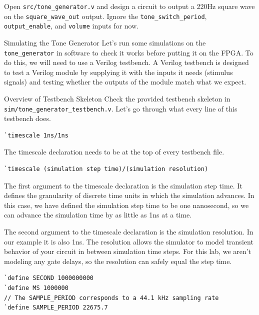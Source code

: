 \documentclass[11pt]{article}
\makeatletter
\renewcommand{\section}
{\@startsection {section}{1}{0pt}
 {-2ex}
 {1ex}
 {\bfseries\Large}}
\renewcommand{\subsection}
{\@startsection {subsection}{1}{0pt}
 {-1ex}
 {0.5ex}
 {\bfseries\normalsize}}
\makeatother
\begin{document}
Open \verb|src/tone_generator.v| and design a circuit to output a 220Hz square wave on the \verb|square_wave_out| output.
Ignore the \verb|tone_switch_period|, \verb|output_enable|, and \verb|volume| inputs for now.

\section{Simulating the Tone Generator}
Let's run some simulations on the \verb|tone_generator| in software to check it works before putting it on the FPGA.
To do this, we will need to use a Verilog testbench.
A Verilog testbench is designed to test a Verilog module by supplying it with the inputs it needs (stimulus signals) and testing whether the outputs of the module match what we expect.

\subsection{Overview of Testbench Skeleton}
Check the provided testbench skeleton in \verb|sim/tone_generator_testbench.v|.
Let's go through what every line of this testbench does.

\begin{verbatim}
`timescale 1ns/1ns
\end{verbatim}

The timescale declaration needs to be at the top of every testbench file.
\begin{verbatim}
`timescale (simulation step time)/(simulation resolution)
\end{verbatim}

The first argument to the timescale declaration is the simulation step time.
It defines the granularity of discrete time units in which the simulation advances.
In this case, we have defined the simulation step time to be one nanosecond, so we can advance the simulation time by as little as 1ns at a time.

The second argument to the timescale declaration is the simulation resolution.
In our example it is also 1ns.
The resolution allows the simulator to model transient behavior of your circuit in between simulation time steps.
For this lab, we aren't modeling any gate delays, so the resolution can safely equal the step time.

\begin{verbatim}
`define SECOND 1000000000
`define MS 1000000
// The SAMPLE_PERIOD corresponds to a 44.1 kHz sampling rate
`define SAMPLE_PERIOD 22675.7
\end{verbatim}
\end{document}
